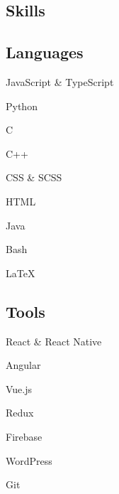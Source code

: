 \documentclass[letterpaper,10pt]{article}
\begin{document}
\begin{minipage}[t]{\dimexpr.33\textwidth-.5\columnsep}
\begin{flushleft}
\section{Skills}
\begin{minipage}[t]{.5\textwidth}
\begin{flushleft}

\subsection{Languages}
\begin{skillslist}
    \item JavaScript \& TypeScript
    \item Python
    \item C
    \item C++
    \item CSS \& SCSS
    \item HTML
    \item Java
    \item Bash
    \item \textrm{\LaTeX}
\end{skillslist}

\end{flushleft}
\end{minipage}%
\begin{minipage}[t]{.5\textwidth}

\subsection{Tools}
\begin{skillslist}
    \item React \& React Native
    \item Angular
    \item Vue.js
    \item Redux
    \item Firebase
    \item WordPress
    \item Git
\end{skillslist}


\end{minipage}
\end{flushleft}
\end{minipage}
\end{document}
